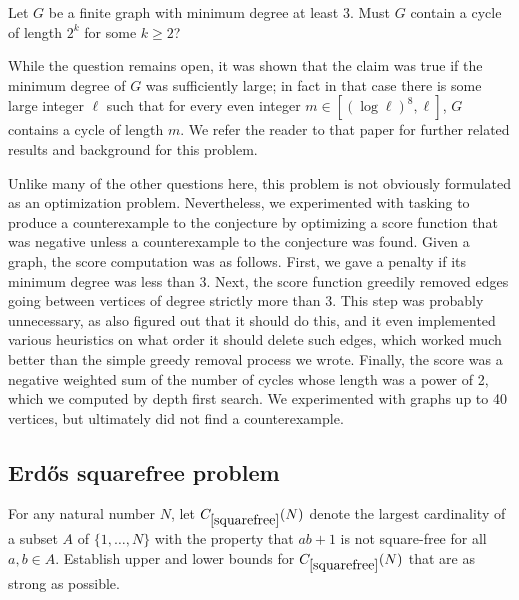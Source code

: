 \renewcommand{\problemURL}{https://google-deepmind.github.io/alphaevolve_repository_of_problems/problems/51.html}

\begin{problem}\label{gyarfas}  Let $G$ be a finite graph with minimum degree at least $3$.  Must $G$ contain a cycle of length $2^k$ for some $k \geq 2$?
\end{problem}

While the question remains open, it was shown \cite{liu2023solution} that the claim was true if the minimum degree of $G$ was sufficiently large; in fact in that case there is some large integer $\ell$
 such that for every even integer $m\in [(\log\ell)^8,\ell]$, $G$ contains a cycle of length $m$.   We refer the reader to that paper for further related results and background for this problem.

Unlike many of the other questions here, this problem is not obviously formulated as an optimization problem.  Nevertheless, we experimented with tasking \AlphaEvolve to produce a counterexample to the conjecture by optimizing a score function that was negative unless a counterexample to the conjecture was found.  Given a graph, the score computation was as follows. First, we gave a penalty if its minimum degree was less than 3. Next, the score function greedily removed edges going between vertices of degree strictly more than 3. This step was probably unnecessary, as \AlphaEvolve also figured out that it should do this, and it even implemented various heuristics on what order it should delete such edges, which worked much better than the simple greedy removal process we wrote.  Finally, the score was a negative weighted sum of the number of cycles whose length was a power of 2, which we computed by depth first search. We experimented with graphs up to 40 vertices, but ultimately did not find a counterexample.


\subsection{Erd\H{o}s squarefree problem}

\renewcommand{\problemURL}{https://google-deepmind.github.io/alphaevolve_repository_of_problems/problems/52.html}

\begin{problem}\label{squarefree} For any natural number $N$, 
let $C_{\ref{squarefree}}(N)$ denote the largest cardinality of a subset $A$ of $\{1,\dots,N\}$ with the property that $ab+1$ is not square-free for all $a,b \in A$.  Establish upper and lower bounds for
$C_{\ref{squarefree}}(N)$ that are as strong as possible.
\end{problem}

